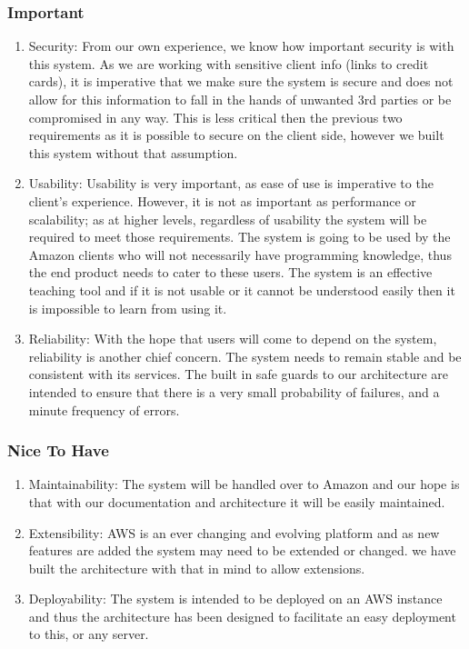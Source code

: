 \documentclass[hidelinks,a4paper,12pt]{article}
\begin{document}
\subsubsection {Important}
\begin{enumerate} 
\item Security: From our own experience, we know how important security is with this system. As we are working with sensitive client info (links to credit cards), it is imperative that we make sure the system is secure and does not allow for this information to fall in the hands of unwanted 3rd parties or be compromised in any way. This is less critical then the previous two requirements as it is possible to secure on the client side, however we built this system without that assumption. 
\item Usability: Usability is very important, as ease of use is imperative to the client's experience. However, it is not as important as performance or scalability; as at higher levels, regardless of usability the system will be required to meet those requirements. The system is going to be used by the Amazon clients who will not necessarily have programming knowledge, thus the end product needs to cater to these users. The system is an effective teaching tool and if it is not usable or it cannot be understood easily then it is impossible to learn from using it.

\item Reliability: With the hope that users will come to depend on the system, reliability is another chief concern. The system needs to remain stable and be consistent with its services. The built in safe guards to our architecture are intended to ensure that there is a very small probability of failures, and a minute frequency of errors.
\end{enumerate} 

\subsubsection {Nice To Have}
\begin{enumerate} 
\item Maintainability: The system will be handled over to Amazon and our hope is that with our documentation and architecture it will be easily maintained. 
\item Extensibility: AWS is an ever changing and evolving platform and as new features are added the system may need to be extended or changed. we have built the architecture with that in mind to allow extensions.
\item Deployability: The system is intended to be deployed on an AWS instance and thus the architecture has been designed to facilitate an easy deployment to this, or any server.
\end{enumerate} 
\end{document}
